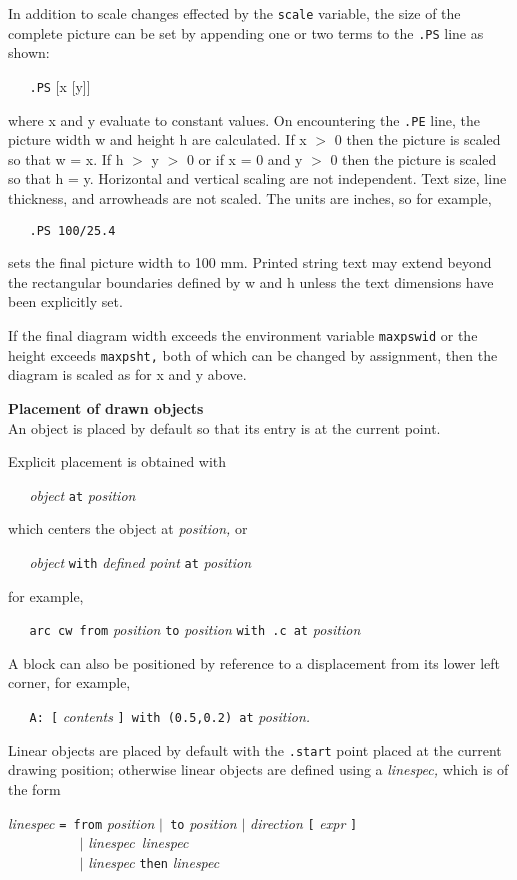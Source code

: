 In addition to scale changes effected by the
{\tt scale}
variable, the size of the complete picture can be set
by appending one or two terms to the
{\tt .PS}
line as shown:

{\tt \ \ \ .PS}
[x [y]]

where x and y evaluate to constant values.
On encountering the 
{\tt .PE}
line, the picture width w and height h are calculated.
If x $>$ 0 then the picture is scaled so that w = x.
If h $>$ y $>$ 0 or if x = 0 and y $>$ 0 then the picture is scaled
so that h = y.
Horizontal and vertical scaling are not independent.
Text size, line thickness, and arrowheads are not scaled.
The units are inches, so for example,

{\tt \ \ \ .PS\ 100/25.4}

sets the final picture width to 100 mm.
Printed string text may extend beyond the rectangular boundaries
defined by w and h unless the text dimensions have been explicitly set.

If the final diagram width exceeds the environment variable
{\tt maxpswid}
or the height exceeds
{\tt maxpsht,}
both of which can be changed by assignment,
then the diagram is scaled as for x and y above.
% 
\par\hskip-2pc{\bf Placement of drawn objects}\\
An object is placed by default so that its entry is at
the current point.

Explicit placement is obtained with

{\it \ \ \ object}
{\tt at}
{\it position}

which centers the object at
{\it position,}
or

{\it \ \ \ object}
{\tt with}
{\it defined point}
{\tt at}
{\it position}

for example,

{\tt \ \ \ arc\ cw\ from}
{\it position}
{\tt to}
{\it position}
{\tt with\ .c\ at}
{\it position}

A block can also be positioned by reference to a displacement from its
lower left corner, for example,

{\tt \ \ \ A:\ [}
{\it contents}
{\tt ]\ with\ (0.5,0.2)\ at}
{\it position.}

Linear objects are placed by default with the
{\tt .start}
point placed at the current drawing
position; otherwise linear objects are defined using a
{\it linespec,}
which is of the form

{\it linespec}
{\tt =\ from}
{\it position}
{\tt $|$\ to}
{\it position}
{\tt $|$}
{\it direction}
{\tt [}
{\it expr}
{\tt ]}
\\\hbox{}\hskip-1pt
{\tt \ \ \ \ \ \ \ \ \ \ $|$}
{\it linespec\ linespec}
\\\hbox{}\hskip-1pt
{\tt \ \ \ \ \ \ \ \ \ \ $|$}
{\it linespec}
{\tt then}
{\it linespec}

